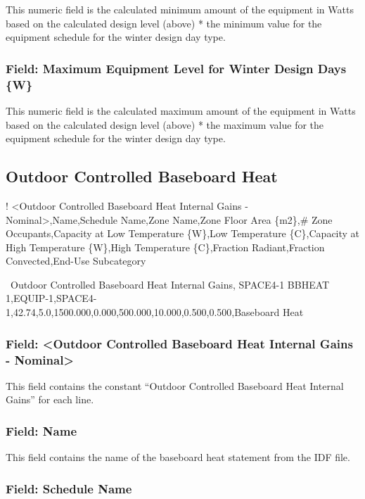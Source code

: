 This numeric field is the calculated minimum amount of the equipment in Watts based on the calculated design level (above) * the minimum value for the equipment schedule for the winter design day type.

\subsubsection{Field: Maximum Equipment Level for Winter Design Days \{W\}}\label{field-maximum-equipment-level-for-winter-designdays-w-1}

This numeric field is the calculated maximum amount of the equipment in Watts based on the calculated design level (above) * the maximum value for the equipment schedule for the winter design day type.


\subsection{Outdoor Controlled Baseboard Heat}\label{outdoor-controlled-baseboard-heat}

! \textless{}Outdoor Controlled Baseboard Heat Internal Gains - Nominal\textgreater{},Name,Schedule Name,Zone Name,Zone Floor Area \{m2\},\# Zone Occupants,Capacity at Low Temperature \{W\},Low Temperature \{C\},Capacity at High Temperature \{W\},High Temperature \{C\},Fraction Radiant,Fraction Convected,End-Use Subcategory

~Outdoor Controlled Baseboard Heat Internal Gains, SPACE4-1 BBHEAT 1,EQUIP-1,SPACE4-1,42.74,5.0,1500.000,0.000,500.000,10.000,0.500,0.500,Baseboard Heat

\subsubsection{Field: \textless{}Outdoor Controlled Baseboard Heat Internal Gains - Nominal\textgreater{}}\label{field-outdoor-controlled-baseboard-heat-internal-gains---nominal}

This field contains the constant ``Outdoor Controlled Baseboard Heat Internal Gains'' for each line.

\subsubsection{Field: Name}\label{field-name-5}

This field contains the name of the baseboard heat statement from the IDF file.

\subsubsection{Field: Schedule Name}\label{field-schedule-name-4}

